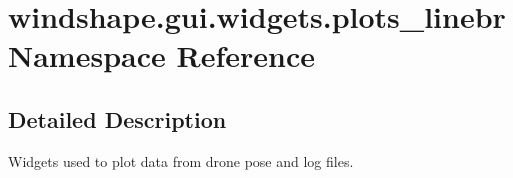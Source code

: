 \hypertarget{namespacewindshape_1_1gui_1_1widgets_1_1plots__linebr}{}\section{windshape.\+gui.\+widgets.\+plots\+\_\+linebr Namespace Reference}
\label{namespacewindshape_1_1gui_1_1widgets_1_1plots__linebr}


\subsection{Detailed Description}
\begin{DoxyVerb}Widgets used to plot data from drone pose and log files.
\end{DoxyVerb}
 
